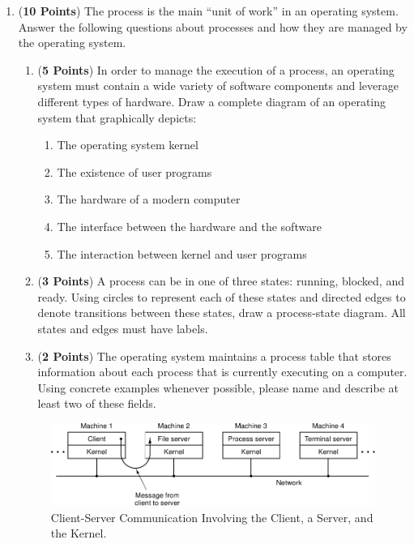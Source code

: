 \documentclass[12pt,epsf,psfig,graphics]{article}
\begin{document}
\begin{enumerate}

\item ({\bf 10 Points}) The process is the main ``unit of work'' in an operating system.  Answer the following questions
  about processes and how they are managed by the operating system.

  \begin{enumerate}

    \item ({\bf 5 Points}) In order to manage the execution of a process, an operating system must contain a wide
      variety of software components and leverage different types of hardware.  Draw a complete diagram of an operating
      system that graphically depicts:

      \begin{enumerate}

        \item The operating system kernel
        \item The existence of user programs
        \item The hardware of a modern computer
        \item The interface between the hardware and the software
        \item The interaction between kernel and user programs

      \end{enumerate}

    \item ({\bf 3 Points}) A process can be in one of three states: running, blocked, and ready. Using circles to
      represent each of these states and directed edges to denote transitions between these states, draw a process-state
      diagram. All states and edges must have labels.

    \item ({\bf 2 Points}) The operating system maintains a process table that stores information about each process
      that is currently executing on a computer. Using concrete examples whenever possible, please name and describe at
      least two of these fields.

  \end{enumerate}

  \newpage

\begin{figure}[t]
  \centering
  \includegraphics{fig1-27}
  \caption{Client-Server Communication Involving the Client, a Server, and the Kernel.}
  \label{fig:clientserver}
\end{figure}


\end{enumerate}
\end{document}
